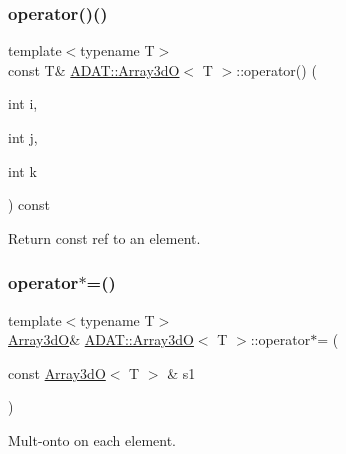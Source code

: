 \subsubsection{\texorpdfstring{operator()()}{operator()()}\hspace{0.1cm}{\footnotesize\ttfamily [4/4]}}
{\footnotesize\ttfamily template$<$typename T$>$ \\
const T\& \mbox{\hyperlink{classADAT_1_1Array3dO}{A\+D\+A\+T\+::\+Array3dO}}$<$ T $>$\+::operator() (\begin{DoxyParamCaption}\item[{int}]{i,  }\item[{int}]{j,  }\item[{int}]{k }\end{DoxyParamCaption}) const\hspace{0.3cm}{\ttfamily [inline]}}



Return const ref to an element. 

\mbox{\label{classADAT_1_1Array3dO_a739c7272b271536ac15a00b5da43b6d6}} 
\subsubsection{\texorpdfstring{operator$\ast$=()}{operator*=()}\hspace{0.1cm}{\footnotesize\ttfamily [1/4]}}
{\footnotesize\ttfamily template$<$typename T$>$ \\
\mbox{\hyperlink{classADAT_1_1Array3dO}{Array3dO}}\& \mbox{\hyperlink{classADAT_1_1Array3dO}{A\+D\+A\+T\+::\+Array3dO}}$<$ T $>$\+::operator$\ast$= (\begin{DoxyParamCaption}\item[{const \mbox{\hyperlink{classADAT_1_1Array3dO}{Array3dO}}$<$ T $>$ \&}]{s1 }\end{DoxyParamCaption})\hspace{0.3cm}{\ttfamily [inline]}}



Mult-\/onto on each element. 

\mbox{\label{classADAT_1_1Array3dO_a739c7272b271536ac15a00b5da43b6d6}} 
